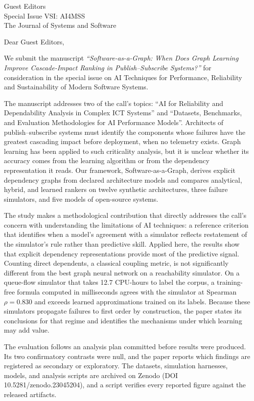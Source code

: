\documentclass[10pt]{letter}
\begin{document}
\begin{letter}{Guest Editors\\Special Issue VSI: AI4MSS\\The Journal of Systems and Software}

\opening{Dear Guest Editors,}

We submit the manuscript \emph{``Software-as-a-Graph: When Does Graph Learning Improve Cascade-Impact Ranking in Publish--Subscribe Systems?''} for consideration in the special issue on AI Techniques for Performance, Reliability and Sustainability of Modern Software Systems.

The manuscript addresses two of the call's topics: ``AI for Reliability and Dependability Analysis in Complex ICT Systems'' and ``Datasets, Benchmarks, and Evaluation Methodologies for AI Performance Models''. Architects of publish--subscribe systems must identify the components whose failures have the greatest cascading impact before deployment, when no telemetry exists. Graph learning has been applied to such criticality analysis, but it is unclear whether its accuracy comes from the learning algorithm or from the dependency representation it reads. Our framework, Software-as-a-Graph, derives explicit dependency graphs from declared architecture models and compares analytical, hybrid, and learned rankers on twelve synthetic architectures, three failure simulators, and five models of open-source systems.

The study makes a methodological contribution that directly addresses the call's concern with understanding the limitations of AI techniques: a reference criterion that identifies when a model's agreement with a simulator reflects restatement of the simulator's rule rather than predictive skill. Applied here, the results show that explicit dependency representations provide most of the predictive signal. Counting direct dependents, a classical coupling metric, is not significantly different from the best graph neural network on a reachability simulator. On a queue-flow simulator that takes 12.7 CPU-hours to label the corpus, a training-free formula computed in milliseconds agrees with the simulator at Spearman $\rho = 0.830$ and exceeds learned approximations trained on its labels. Because these simulators propagate failures to first order by construction, the paper states its conclusions for that regime and identifies the mechanisms under which learning may add value.

The evaluation follows an analysis plan committed before results were produced. Its two confirmatory contrasts were null, and the paper reports which findings are registered as secondary or exploratory. The datasets, simulation harnesses, models, and analysis scripts are archived on Zenodo (DOI 10.5281/zenodo.23045204), and a script verifies every reported figure against the released artifacts.


\end{letter}
\end{document}
